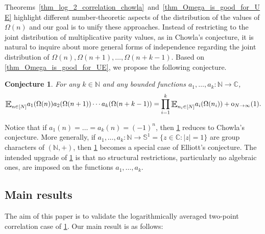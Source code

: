 \documentclass[letter,11pt]{article}
\theoremstyle{plain} %
\newtheorem{conjecture}[theorem]{Conjecture}
\theoremstyle{definition} %
\theoremstyle{plain}
\theoremstyle{plain}
\theoremstyle{plain}
\numberwithin{equation}{section}
\newcommand{\oh}{{\mathrm o}}
\newcommand{\N}{\mathbb{N}}
\newcommand{\C}{\mathbb{C}}
\newcommand{\edit}[3]{\color{#1}{#3}\color{black}\marginpar{\textcolor{#1}{[[#2]]}}}
\newcommand{\new}[1]{\edit{blue}{NEW}{#1}}
\newcommand{\Esub}[1]{\raisebox{-0.4ex}{\scalebox{1.4}[1.3]{$\mathbb{E}$}}\raisebox{-0.35ex}{\ensuremath{_{\scriptstyle #1}}}}
\newcommand{\1}{\mathbbm{1}}
\begin{document}
Theorems~\ref{thm_log_2_correlation_chowla}~and~\ref{thm_Omega_is_good_for_UE} highlight different number-theoretic aspects of the distribution of the values of $\Omega(n)$ and 
our goal is to unify these approaches.
Instead of restricting to the joint distribution of multiplicative parity values, as in Chowla's conjecture, it is natural to inquire about more general forms of independence regarding the joint distribution of $\Omega(n),\Omega(n+1),\ldots,\Omega(n+k-1)$. 
Based on \cref{thm_Omega_is_good_for_UE}, we propose the following conjecture. %


\begin{conjecture}
\label{conj_functional_chowla}
For any $k\in\N$ and any bounded functions $a_1,\ldots,a_k\colon\N\to\C$,
$$
\Esub{n\in[N]} a_1(\Omega(n))a_2(\Omega(n+1))\cdots a_k(\Omega(n+k-1))
= \prod_{i=1}^k \Esub{n_i\in[N]} a_i(\Omega(n_i)) + \oh_{N\to\infty}(1).
$$
\end{conjecture}

Notice that if $a_1(n)=\ldots=a_k(n)=(-1)^{n}$, then \cref{conj_functional_chowla} reduces to Chowla's conjecture. More generally, if $a_1,\ldots,a_k\colon\N\to\mathbb{S}^1=\{z\in\C: |z|=1\}$ are group characters of $(\N,+)$, then \cref{conj_functional_chowla} becomes a special case of Elliott's conjecture. The intended upgrade of \cref{conj_functional_chowla} is that no structural restrictions, particularly no algebraic ones, are imposed on the functions $a_1,\ldots,a_k$.

\subsection{Main results}

The aim of this paper is to validate the logarithmically averaged two-point correlation case of \cref{conj_functional_chowla}. %
Our main result is as follows:
\end{document}
